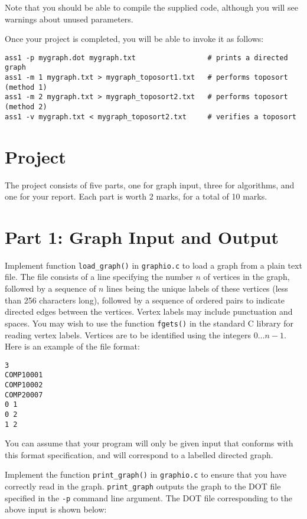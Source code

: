 \documentclass[11pt]{article}
\begin{document}
\noindent
Note that you should be able to compile the supplied code,
although you will see warnings about unused parameters.

Once your project is completed, you will be able to invoke it as follows:

\begin{verbatim}
ass1 -p mygraph.dot mygraph.txt                 # prints a directed graph
ass1 -m 1 mygraph.txt > mygraph_toposort1.txt   # performs toposort (method 1)
ass1 -m 2 mygraph.txt > mygraph_toposort2.txt   # performs toposort (method 2)
ass1 -v mygraph.txt < mygraph_toposort2.txt     # verifies a toposort
\end{verbatim}

\section*{Project}

The project consists of five parts, one for graph input,
three for algorithms, and one for your report.
Each part is worth 2 marks, for a total of 10 marks.

\section*{Part 1: Graph Input and Output}

Implement function \texttt{load\_graph()} in \texttt{graphio.c} to load a graph from a plain text file.
The file consists of a line specifying the number $n$ of vertices in the graph,
followed by a sequence of $n$ lines being the unique labels of these vertices (less than 256 characters long),
followed by a sequence of ordered pairs to indicate directed edges between the vertices.
Vertex labels may include punctuation and spaces.
You may wish to use the function \texttt{fgets()} in the standard C library for reading vertex labels.
Vertices are to be identified using the integers $0 \ldots n - 1$.
Here is an example of the file format:

\begin{verbatim}
3
COMP10001
COMP10002
COMP20007
0 1
0 2
1 2
\end{verbatim}

You can assume that your program will only be given input that conforms with this format specification,
and will correspond to a labelled directed graph.

Implement the function \texttt{print\_graph()} in \texttt{graphio.c} to ensure that you have correctly read in the graph.
\texttt{print\_graph} outputs the graph to the DOT file specified in the \texttt{-p} command line argument.
The DOT file corresponding to the above input is shown below:
\end{document}
